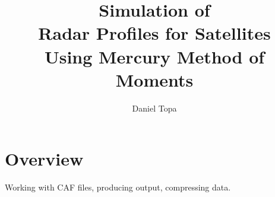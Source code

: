 \documentclass[10pt, oneside]{article}   	%
\title{Simulation of \\Radar Profiles for Satellites \\Using Mercury Method of Moments}
\author{Daniel Topa\\\TopaHIIEmail}
\affil{\hiiafil}
\begin{document}
\maketitle
{}
\tableofcontents

\section{Overview}
\cite{topa20200303}
Working with CAF files, producing output, compressing data.
\cite{topa-4-20-2024}
\cite{topa-4-20-2024}

			
			
			\appendix
			

	\printbibliography
%
% 
%
%
%
%
\end{document}
